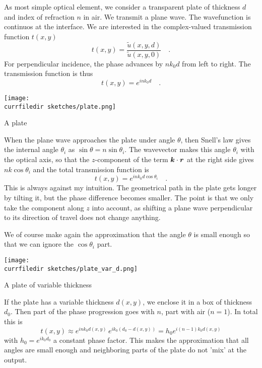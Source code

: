 As most simple optical element, we consider a transparent plate of thickness $d$ and index of refraction $n$ in air. We transmit a plane wave. The wavefunction is continuos at the interface. We are interested in the complex-valued transmission function $t(x,y)$
\begin{equation}
    t(x,y) = \frac{\tilde{u}(x,y,d)}{\tilde{u}(x,y,0)} \quad .
\end{equation}
For perpendicular incidence, the phase advances by $n k_0 d$ from left to right. The transmission function is thus
\begin{equation}
    t(x,y)  = e^{i n k_0 d} \quad .
\end{equation}

\begin{marginfigure}
    \texttt{[image: \\currfiledir sketches/plate.png]}
   \caption{A plate}
\end{marginfigure}


When the plane wave approaches the plate under angle $\theta$, then Snell's law gives the internal angle $\theta_i$ as $\sin \theta = n \sin \theta_i$. The wavevector makes this angle $\theta_i$ with the optical axis, so that the $z$-component of the term $\boldsymbol{k} \cdot \boldsymbol{r}$ at the right side gives $n k \cos \theta_i$ and the total transmission function is
\begin{equation}
    t(x,y)  = e^{i n k_0 d \cos \theta_i} \quad .
\end{equation}
This is always against my intuition. The geometrical path in the plate gets longer by tilting it, but the phase difference becomes smaller. The point is that we only take the component along $z$ into account, as shifting a plane wave perpendicular to its direction of travel does not change anything.

We of course make again the approximation that the angle $\theta$ is small enough so that we can ignore the $\cos \theta_i$ part.

\begin{marginfigure}
    \texttt{[image: \\currfiledir sketches/plate\_var\_d.png]}
   \caption{A plate of variable thickness}
\end{marginfigure}


If the plate has a variable thickness $d(x,y)$, we enclose it in a box of thickness $d_0$. Then part of the phase progression goes with $n$, part with air ($n=1$). In total this is
\begin{equation}
    t(x,y) \approx e^{i n k_0 d(x,y)} \,  e^{i k_0 (d_0 - d(x,y))}
    = h_0   e^{i (n-1) k_0 d(x,y)}
\end{equation}
with $h_0 = e^{i  k_0 d_0}$ a constant phase factor. This makes the approximation that all angles are small enough and neighboring parts of the plate do not 'mix' at the output.


